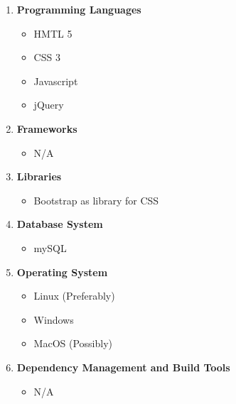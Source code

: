 \documentclass{article}
\begin{document}
				\begin{enumerate}
				\item \textbf{Programming Languages}
				\begin{itemize}
					\item HMTL 5
					\item CSS 3
					\item Javascript
					\item jQuery
				\end{itemize}
				\item \textbf{Frameworks}
				\begin{itemize}
					\item N/A
				\end{itemize}
				\item \textbf{Libraries}
				\begin{itemize}
					\item Bootstrap as library for CSS
				\end{itemize}
				\item \textbf{Database System}
				\begin{itemize}
					\item mySQL
				\end{itemize}
				\item \textbf{Operating System}
				\begin{itemize}
					\item Linux (Preferably)
					\item Windows
					\item MacOS (Possibly)
				\end{itemize}
				\item \textbf{Dependency Management and Build Tools}
				\begin{itemize}
					\item N/A
				\end{itemize}
			\end{enumerate}
		
			
\end{document}
